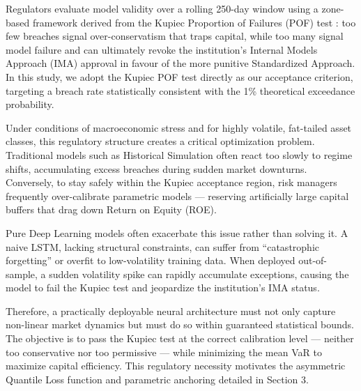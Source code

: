 Regulators evaluate model validity over a rolling 250-day window using a zone-based framework derived from the Kupiec Proportion of Failures (POF) test \cite{kupiec1995techniques}: too few breaches signal over-conservatism that traps capital, while too many signal model failure and can ultimately revoke the institution's Internal Models Approach (IMA) approval in favour of the more punitive Standardized Approach. In this study, we adopt the Kupiec POF test directly as our acceptance criterion, targeting a breach rate statistically consistent with the 1\% theoretical exceedance probability.

Under conditions of macroeconomic stress and for highly volatile, fat-tailed asset classes, this regulatory structure creates a critical optimization problem. Traditional models such as Historical Simulation often react too slowly to regime shifts, accumulating excess breaches during sudden market downturns. Conversely, to stay safely within the Kupiec acceptance region, risk managers frequently over-calibrate parametric models --- reserving artificially large capital buffers that drag down Return on Equity (ROE).

Pure Deep Learning models often exacerbate this issue rather than solving it. A naive LSTM, lacking structural constraints, can suffer from ``catastrophic forgetting'' or overfit to low-volatility training data. When deployed out-of-sample, a sudden volatility spike can rapidly accumulate exceptions, causing the model to fail the Kupiec test and jeopardize the institution's IMA status.

Therefore, a practically deployable neural architecture must not only capture non-linear market dynamics but must do so within guaranteed statistical bounds. The objective is to pass the Kupiec test at the correct calibration level --- neither too conservative nor too permissive --- while minimizing the mean VaR to maximize capital efficiency. This regulatory necessity motivates the asymmetric Quantile Loss function and parametric anchoring detailed in Section 3.